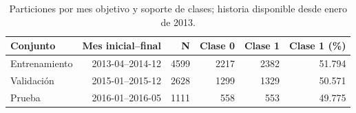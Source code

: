 \begin{table}[htbp]
\centering\small
\caption{Particiones por mes objetivo y soporte de clases; historia disponible desde enero de 2013.}\label{tab:particiones}
\begin{tabular}{lrrrrr}\toprule
Conjunto & Mes inicial--final & N & Clase 0 & Clase 1 & Clase 1 (\%) \\ \midrule
Entrenamiento & 2013-04--2014-12 & 4599 & 2217 & 2382 & 51.794 \\
Validación & 2015-01--2015-12 & 2628 & 1299 & 1329 & 50.571 \\
Prueba & 2016-01--2016-05 & 1111 & 558 & 553 & 49.775 \\
\bottomrule\end{tabular}
\end{table}
